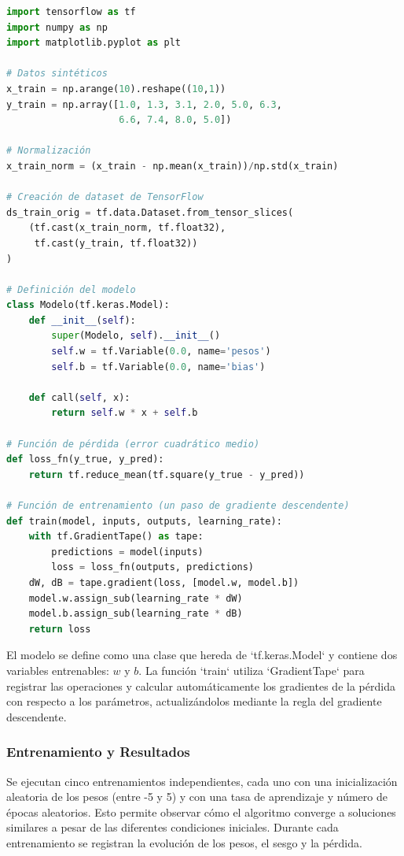 \documentclass[12pt]{article}
\begin{document}
\begin{lstlisting}[language=Python, caption={Preparación de datos y definición del modelo de regresión lineal}, label={lst:regresion1}]
import tensorflow as tf
import numpy as np 
import matplotlib.pyplot as plt

# Datos sintéticos
x_train = np.arange(10).reshape((10,1))
y_train = np.array([1.0, 1.3, 3.1, 2.0, 5.0, 6.3,
                    6.6, 7.4, 8.0, 5.0])

# Normalización
x_train_norm = (x_train - np.mean(x_train))/np.std(x_train)

# Creación de dataset de TensorFlow
ds_train_orig = tf.data.Dataset.from_tensor_slices(
    (tf.cast(x_train_norm, tf.float32),
     tf.cast(y_train, tf.float32))
)

# Definición del modelo
class Modelo(tf.keras.Model):
    def __init__(self):
        super(Modelo, self).__init__()
        self.w = tf.Variable(0.0, name='pesos')
        self.b = tf.Variable(0.0, name='bias')

    def call(self, x):
        return self.w * x + self.b

# Función de pérdida (error cuadrático medio)
def loss_fn(y_true, y_pred):
    return tf.reduce_mean(tf.square(y_true - y_pred))

# Función de entrenamiento (un paso de gradiente descendente)
def train(model, inputs, outputs, learning_rate):
    with tf.GradientTape() as tape:
        predictions = model(inputs)
        loss = loss_fn(outputs, predictions)
    dW, dB = tape.gradient(loss, [model.w, model.b])
    model.w.assign_sub(learning_rate * dW)
    model.b.assign_sub(learning_rate * dB)
    return loss
\end{lstlisting}

El modelo se define como una clase que hereda de `tf.keras.Model` y contiene dos variables entrenables: $w$ y $b$. La función `train` utiliza `GradientTape` para registrar las operaciones y calcular automáticamente los gradientes de la pérdida con respecto a los parámetros, actualizándolos mediante la regla del gradiente descendente.

\subsubsection*{Entrenamiento y Resultados}

Se ejecutan cinco entrenamientos independientes, cada uno con una inicialización aleatoria de los pesos (entre -5 y 5) y con una tasa de aprendizaje y número de épocas aleatorios. Esto permite observar cómo el algoritmo converge a soluciones similares a pesar de las diferentes condiciones iniciales. Durante cada entrenamiento se registran la evolución de los pesos, el sesgo y la pérdida.
\end{document}
